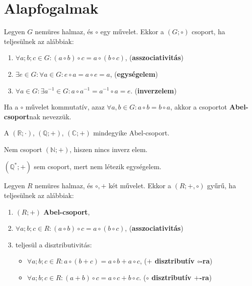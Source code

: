 \clearpage

\section{Alapfogalmak}\label{sec-01-01}

\begin{definition}[Csoport]
  Legyen $G$ nemüres halmaz, és $\circ$ egy művelet. Ekkor a $(G; \circ)$ csoport,
  ha teljesülnek az alábbiak:
  \begin{enumerate}
    \item $\forall a; b; c \in G: (a \circ b) \circ c = a \circ (b \circ c)$,
          \hfill (\textbf{asszociativitás})

    \item $\exists e \in G: \forall a \in G: e \circ a = a \circ e = a$,
          \hfill(\textbf{egységelem})

    \item $\forall a \in G: \exists a^{-1} \in G:
            a \circ a^{-1} = a^{-1} \circ a = e$.
          \hfill (\textbf{inverzelem})
  \end{enumerate}
\end{definition}

\begin{note}
  Ha a $\circ$ művelet kommutatív, azaz $\forall a, b \in G: a \circ b = b \circ
    a$, akkor a csoportot \textbf{Abel-csoport}nak nevezzük.
\end{note}

\begin{example}
  A $(\mathbb R; \cdot)$, $(\mathbb Q; +)$, $(\mathbb C; +)$ mindegyike
  Abel-csoport.

  Nem csoport $(\mathbb N; +)$, hiszen nincs inverz elem.

  $(\mathbb Q^*; +)$ sem csoport, mert nem létezik egységelem.
\end{example}

\begin{definition}[Gyűrű]
  Legyen $R$ nemüres halmaz, és $\circ, +$ két művelet. Ekkor a $(R; +, \circ)$
  gyűrű, ha teljesülnek az alábbiak:
  \begin{enumerate}
    \item $(R; +)$ \textbf{Abel-csoport},

    \item $\forall a; b; c \in R: (a \circ b) \circ c = a \circ (b \circ c)$,
          \hfill (\textbf{asszociativitás})

    \item teljesül a disztributivitás:
          \begin{itemize}
            \item $\forall a; b; c \in R:
                    a \circ (b + c) = a \circ b + a \circ c$,
                  \hfill (\textbf{$+$ disztributív $\circ$-ra})

            \item $\forall a; b; c \in R:
                    (a + b) \circ c = a \circ c + b \circ c$.
                  \hfill (\textbf{$\circ$ disztributív $+$-ra})
          \end{itemize}
  \end{enumerate}
\end{definition}

